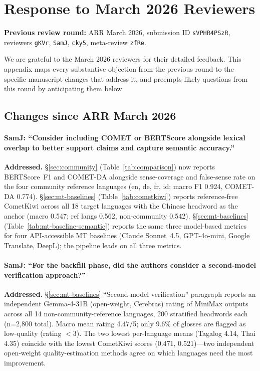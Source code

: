 \documentclass[11pt]{article}
\begin{document}
\section{Response to March 2026 Reviewers}
\label{sec:response-letter}

\textbf{Previous review round:} ARR March 2026, submission ID \texttt{sVPHR4PSzR}, reviewers \texttt{gKVr}, \texttt{SamJ}, \texttt{cky5}, meta-review \texttt{zfRe}.

We are grateful to the March 2026 reviewers for their detailed feedback. This appendix maps every substantive objection from the previous round to the specific manuscript changes that address it, and preempts likely questions from this round by anticipating them below.

\subsection{Changes since ARR March 2026}
\label{sec:response-changes}

\paragraph{SamJ: ``Consider including COMET or BERTScore alongside lexical overlap to better support claims and capture semantic accuracy.''}

\textbf{Addressed.} \S\ref{sec:community} (Table~\ref{tab:comparison}) now reports BERTScore~F1 and COMET-DA alongside sense-coverage and false-sense rate on the four community reference languages (en, de, fr, id; macro F1 0.924, COMET-DA 0.774). \S\ref{sec:mt-baselines} (Table~\ref{tab:cometkiwi}) reports reference-free CometKiwi across all 18 target languages with the Chinese headword as the anchor (macro 0.547; ref langs 0.562, non-community 0.542). \S\ref{sec:mt-baselines} (Table~\ref{tab:mt-baseline-semantic}) reports the same three model-based metrics for four API-accessible MT baselines (Claude Sonnet~4.5, GPT-4o-mini, Google Translate, DeepL); the pipeline leads on all three metrics.

\paragraph{SamJ: ``For the backfill phase, did the authors consider a second-model verification approach?''}

\textbf{Addressed.} \S\ref{sec:mt-baselines} ``Second-model verification'' paragraph reports an independent Gemma-4-31B (open-weight, Cerebras) rating of MiniMax outputs across all 14 non-community-reference languages, 200 stratified headwords each (n=2{,}800 total). Macro mean rating 4.47/5; only 9.6\% of glosses are flagged as low-quality (rating $<$3). The two lowest per-language means (Tagalog 4.14, Thai 4.35) coincide with the lowest CometKiwi scores (0.471, 0.521)---two independent open-weight quality-estimation methods agree on which languages need the most improvement.
\end{document}
